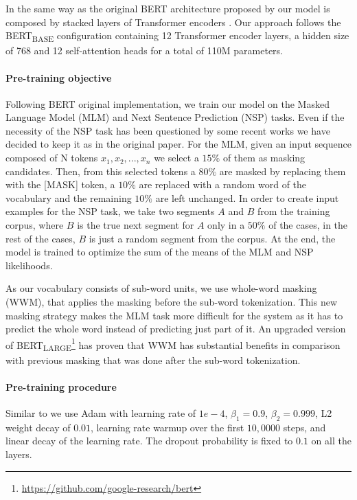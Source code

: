 \documentclass[10pt, a4paper]{article}
\begin{document}
In the same way as the original BERT architecture proposed by  our model is composed by stacked layers of Transformer encoders \cite{vaswani2017attention}. Our approach follows the BERT\textsubscript{BASE} configuration containing 12 Transformer encoder layers, a hidden size of 768 and 12 self-attention heads for a total of 110M parameters. 

\paragraph{Pre-training objective}

Following BERT original implementation, we train our model on the Masked Language Model (MLM) and Next Sentence Prediction (NSP) tasks. Even if the necessity of the NSP task has been questioned by some recent works \cite{yang2019xlnet,liu2019roberta,lample2019cross} we have decided to keep it as in the original paper. For the MLM, given an input sequence composed of N tokens $x_1, x_2, ..., x_n$ we select a $15\%$ of them as masking candidates. Then, from this selected tokens a $80\%$ are masked by replacing them with the [MASK] token, a $10\%$ are replaced with a random word of the vocabulary and the remaining $10\%$ are left unchanged. In order to create input examples for the NSP task, we take two segments $A$ and $B$ from the training corpus, where $B$ is the true next segment for $A$ only in a $50\%$ of the cases, in the rest of the cases, $B$ is just a random segment from the corpus. At the end, the model is trained to optimize the sum of the means of the MLM and NSP likelihoods.

As our vocabulary consists of sub-word units, we use whole-word masking (WWM), that applies the masking before the sub-word tokenization. This new masking strategy makes the MLM task more difficult for the system as it has to predict the whole word instead of predicting just part of it. An upgraded version of BERT\textsubscript{LARGE}\footnote{\url{https://github.com/google-research/bert}} has proven that WWM has substantial benefits in comparison with previous masking that was done after the sub-word tokenization. 

\paragraph{Pre-training procedure}

Similar to \cite{devlin2019bert} we use Adam with learning rate of $1e-4$, $\beta_1=0.9$, $\beta_2=0.999$, L2 weight decay of $0.01$, learning rate warmup over the first $10,0000$ steps, and linear decay of the learning rate. The dropout probability is fixed to $0.1$ on all the layers. 
\end{document}
